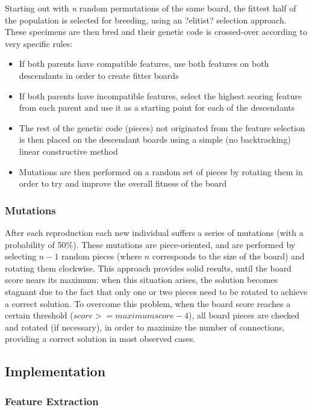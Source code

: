 \documentclass{llncs}
\begin{document}
Starting out with \textit{n} random permutations of the same board, the fittest half of the population is selected for breeding, using an ?elitist? selection approach. These specimens are then bred and their genetic code is crossed-over according to very specific rules:

\begin{itemize}
	\item If both parents have compatible features, use both features on both descendants in order to create fitter boards
	\item If both parents have incompatible features, select the highest scoring feature from each parent and use it as a starting point for each of the descendants
	\item The rest of the genetic code (pieces) not originated from the feature selection is then placed on the descendant boards using a simple (no backtracking) linear constructive method
	\item Mutations are then performed on a random set of pieces by rotating them in order to try and improve the overall fitness of the board
\end{itemize}

\subsubsection{Mutations}\label{sec:mutations}

After each reproduction each new individual suffers a series of mutations (with a probability of 50\%). These mutations are piece-oriented, and are performed by selecting $n-1$ random pieces (where $n$ corresponds to the size of the board) and rotating them clockwise. This approach provides solid results, until the board score nears its maximum: when this situation arises, the solution becomes stagnant due to the fact that only one or two pieces need to be rotated to achieve a correct solution. To overcome this problem, when the board score reaches a certain threshold ($score >= maximum score - 4$), all board pieces are checked and rotated (if necessary), in order to maximize the number of connections, providing a correct solution in most observed cases.

\subsection{Implementation}\label{sec:implementation}

\subsubsection{Feature Extraction}\label{sec:feature_extraction}
\end{document}
